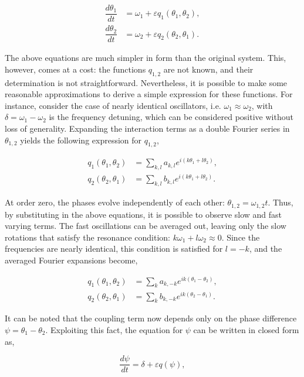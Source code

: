 \begin{align}
    \dfrac{d\theta_1}{dt} &= \omega_1 + \varepsilon q_1(\theta_1, \theta_2), \\
    \dfrac{d\theta_2}{dt} &= \omega_2 + \varepsilon q_2(\theta_2, \theta_1).
\end{align}

The above equations are much simpler in form than the original system. This, however, comes at a cost: 
the functions $q_{1,2}$ are not known, and their determination is not straightforward. Nevertheless,
it is possible to make some reasonable approximations to derive a simple expression for these functions.
For instance, consider the case of nearly identical oscillators, i.e. $\omega_1 \approx \omega_2$,
with $\delta = \omega_1 - \omega_2$ is the frequency detuning, which can be considered positive
without loss of generality. Expanding the interaction terms as a double Fourier
series in $\theta_{1,2}$ yields the following expression for $q_{1,2}$,

\begin{align*}
    q_1(\theta_1, \theta_2) &= \sum_{k,l} a_{k,l} e^{i(k\theta_1 + l\theta_2)},\\
    q_2(\theta_2, \theta_1) &= \sum_{k,l} b_{k,l} e^{i(k\theta_1 + l\theta_2)}.
\end{align*}

At order zero, the phases evolve independently of each other: $\theta_{1,2} = \omega_{1,2} t$.
Thus, by substituting in the above equations, it is possible to observe slow and fast varying terms.
The fast oscillations can be averaged out, leaving only the slow rotations that satisfy the resonance
condition: $k\omega_1 + l\omega_2 \approx 0$. Since the frequencies are nearly identical, this
condition is satisfied for $l = -k$, and the averaged Fourier expansions become,

\begin{align*}
    q_1(\theta_1, \theta_2) &= \sum_{k} a_{k,-k} e^{ik(\theta_1 - \theta_2)},\\
    q_2(\theta_2, \theta_1) &= \sum_{k} b_{k,-k} e^{ik(\theta_2 - \theta_1)}.
\end{align*}

It can be noted that the coupling term now depends only on the phase difference
$\psi = \theta_1 - \theta_2$. Exploiting this fact, the equation for $\psi$ can be written
in closed form as,

\begin{equation}
    \dfrac{d\psi}{dt} = \delta + \varepsilon q(\psi),
    \label{eq:pre_gen_adler}
\end{equation}

